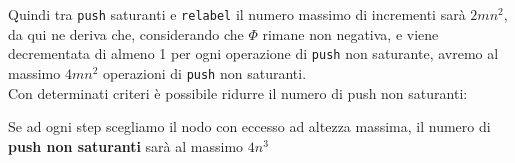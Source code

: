Quindi tra \texttt{push} saturanti e \texttt{relabel} il numero massimo di
incrementi sarà $2mn^2$, da qui ne deriva che, considerando che $\Phi$ rimane
non negativa, e viene decrementata di almeno 1 per ogni operazione di
\texttt{push} non saturante, avremo al massimo $4mn^2$ operazioni di
\texttt{push} non saturanti.\\

Con determinati criteri è possibile ridurre il numero di push non saturanti:

\begin{myblockquote}
      Se ad ogni step scegliamo il nodo con eccesso ad altezza massima, il numero
      di \textbf{push non saturanti} sarà al massimo $4n^3$
\end{myblockquote}